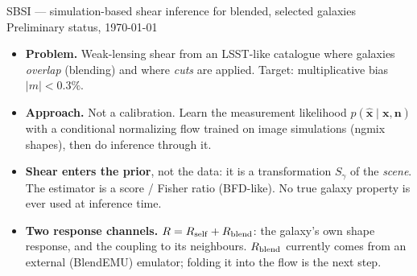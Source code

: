 \documentclass[aspectratio=169,10pt]{beamer}
\newcommand{\xh}{\hat{\mathbf{x}}}
\newcommand{\xt}{\mathbf{x}}
\newcommand{\nb}{\mathbf{n}}
\newcommand{\Rsf}{R_{\rm self}}
\newcommand{\Rbl}{R_{\rm blend}}
\begin{document}
\begin{frame}{SBSI --- simulation-based shear inference for blended, selected galaxies}
\vspace{2mm}
{\large Preliminary status, \today}
\vspace{4mm}

\begin{itemize}\itemsep5pt
  \item \textbf{Problem.} Weak-lensing shear from an LSST-like catalogue where galaxies
        \emph{overlap} (blending) and where \emph{cuts} are applied. Target: multiplicative
        bias $|m|<0.3\%$.
  \item \textbf{Approach.} Not a calibration. Learn the measurement likelihood
        $p(\xh\mid\xt,\nb)$ with a conditional normalizing flow trained on image
        simulations (ngmix shapes), then do inference through it.
  \item \textbf{Shear enters the prior}, not the data: it is a transformation $S_\gamma$ of the
        \emph{scene}. The estimator is a score / Fisher ratio (BFD-like). No true galaxy
        property is ever used at inference time.
  \item \textbf{Two response channels.} $R=\Rsf+\Rbl$: the galaxy's own shape response, and
        the coupling to its neighbours. $\Rbl$ currently comes from an external
        (BlendEMU) emulator; folding it into the flow is the next step.
\end{itemize}
\end{frame}
\end{document}
